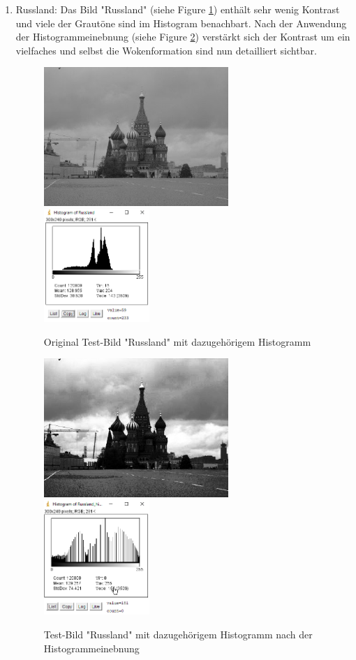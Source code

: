 \documentclass[12pt,german]{article}
\begin{document}
\begin{enumerate}
\item Russland: 
Das Bild "Russland"  (siehe Figure \ref{fig:Russland01}) enthält sehr wenig Kontrast und viele der Grautöne sind im Histogram benachbart. Nach der Anwendung der Histogrammeinebnung  (siehe Figure \ref{fig:Russland02}) verstärkt sich der Kontrast um ein vielfaches und selbst die Wokenformation sind nun detailliert sichtbar.
\begin{figure}[H] \centering
	\includegraphics[width=7cm]{../testData/Results/Russland/Russland.jpg}
	\includegraphics[width=4cm]{../testData/Results/Russland/Russland-histogram.png}
	\caption{Original Test-Bild "Russland" mit dazugehörigem Histogramm}
	 \label{fig:Russland01}
\end{figure}
\begin{figure}[H] \centering
	\includegraphics[width=7cm]{../testData/Results/Russland/Russland-equalized.jpg}
	\includegraphics[width=4cm]{../testData/Results/Russland/Russland-equalized-histogram.png}
	\caption{Test-Bild "Russland" mit dazugehörigem Histogramm nach der Histogrammeinebnung}
	 \label{fig:Russland02}
\end{figure}


\end{enumerate}
\end{document}
